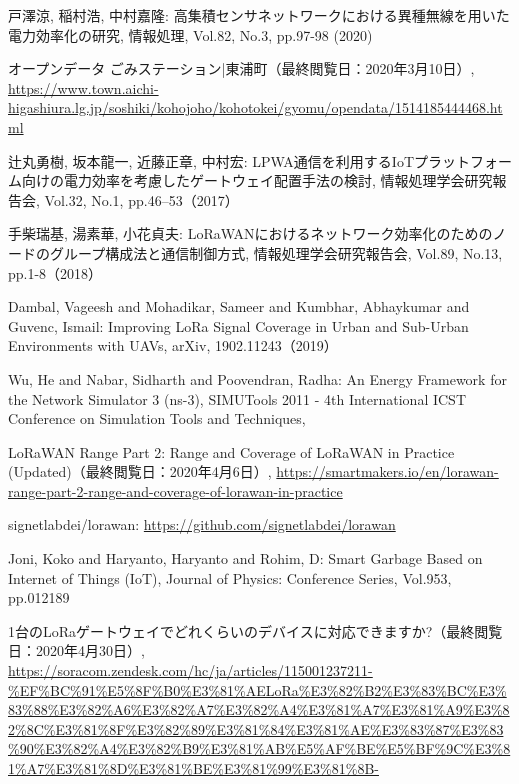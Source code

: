 \documentclass[Japanese]{dicomopapers}
\begin{document}
\begin{thebibliography}{4}
     戸澤涼, 稲村浩, 中村嘉隆:  高集積センサネットワークにおける異種無線を用いた電力効率化の研究, 情報処理, Vol.82, No.3, pp.97-98 (2020)
    
     オープンデータ ごみステーション|東浦町（最終閲覧日：2020年3月10日）, \url{https://www.town.aichi-higashiura.lg.jp/soshiki/kohojoho/kohotokei/gyomu/opendata/1514185444468.html}

     辻丸勇樹, 坂本龍一, 近藤正章, 中村宏: LPWA通信を利用するIoTプラットフォーム向けの電力効率を考慮したゲートウェイ配置手法の検討, 情報処理学会研究報告会, Vol.32, No.1, pp.46–53（2017）

     手柴瑞基, 湯素華, 小花貞夫: LoRaWANにおけるネットワーク効率化のためのノードのグループ構成法と通信制御方式, 情報処理学会研究報告会, Vol.89, No.13, pp.1-8（2018）

     Dambal, Vageesh and Mohadikar, Sameer and Kumbhar, Abhaykumar and Guvenc, Ismail: Improving LoRa Signal Coverage in Urban and Sub-Urban Environments with UAVs, arXiv, 1902.11243（2019）

     Wu, He and Nabar, Sidharth and Poovendran, Radha: An Energy Framework for the Network Simulator 3 (ns-3), SIMUTools 2011 - 4th International ICST Conference on Simulation Tools and Techniques, 

     LoRaWAN Range Part 2: Range and Coverage of LoRaWAN in Practice (Updated)（最終閲覧日：2020年4月6日）, \url{https://smartmakers.io/en/lorawan-range-part-2-range-and-coverage-of-lorawan-in-practice}

     signetlabdei/lorawan: \url{https://github.com/signetlabdei/lorawan}

     Joni, Koko and Haryanto, Haryanto and Rohim, D: Smart Garbage Based on Internet of Things (IoT), Journal of Physics: Conference Series, Vol.953, pp.012189

     1台のLoRaゲートウェイでどれくらいのデバイスに対応できますか?（最終閲覧日：2020年4月30日）, \url{https://soracom.zendesk.com/hc/ja/articles/115001237211-%EF%BC%91%E5%8F%B0%E3%81%AELoRa%E3%82%B2%E3%83%BC%E3%83%88%E3%82%A6%E3%82%A7%E3%82%A4%E3%81%A7%E3%81%A9%E3%82%8C%E3%81%8F%E3%82%89%E3%81%84%E3%81%AE%E3%83%87%E3%83%90%E3%82%A4%E3%82%B9%E3%81%AB%E5%AF%BE%E5%BF%9C%E3%81%A7%E3%81%8D%E3%81%BE%E3%81%99%E3%81%8B-}


\end{thebibliography}
\end{document}
